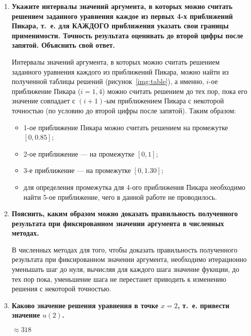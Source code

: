 \begin{enumerate}[label=\textbf{\arabic*})]
    \item \textbf{Укажите интервалы значений аргумента, в которых можно считать решением
        заданного уравнения каждое из первых 4-х приближений Пикара, т.~е. для
        КАЖДОГО приближения указать свои границы применимости. Точность
        результата оценивать до второй цифры после запятой. Объяснить свой
        ответ.}

        Интервалы значений аргумента, в которых можно считать решением
        заданного уравнения каждого из приближений Пикара, можно найти из
        полученной таблицы решений (рисунок~\ref{img:table}), а
        именно, $i$-ое приближение Пикара ($i = \overline{1, 4}$) можно считать
        решением до тех пор, пока его значение совпадает с $(i+1)$-ым
        приближением Пикара с некоторой точностью (по условию до второй
        цифры после запятой). Таким образом:

        \begin{itemize}
            \item 1-ое приближение Пикара можно считать решением на
                промежутке $[0, 0.85]$;
            \item 2-ое приближение --- на промежутке $[0, 1]$;
            \item 3-е приближение --- на промежутке $[0, 1.30]$;
            \item для определения промежутка для 4-ого приближения Пикара
                необходимо найти 5-ое приближение, чего в данной работе не
                проводилось.
        \end{itemize}

    \item \textbf{Пояснить, каким образом можно доказать правильность полученного
        результата при фиксированном значении аргумента в численных методах.}

        В численных методах для того, чтобы доказать правильность полученного
        результата при фиксированном значении аргумента, необходимо итерационно
        уменьшать шаг до нуля, вычисляя для каждого шага значение фукнции, до
        тех пор пока, уменьшение шага не перестанет приводить к изменению
        решения с некоторой точностью.

    \item \textbf{Каково значение решения уравнения в точке $x=2$, т.~е. привести значение
        $u(2)$.}

        $\approx 318$


\end{enumerate}
